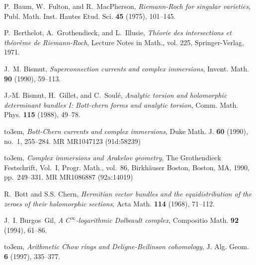 \documentclass[10pt,twoside]{article}
\numberwithin{equation}{section}
\theoremstyle{plain}
\theoremstyle{definition}
\begin{document}
%

\newcommand{\noopsort}[1]{} \newcommand{\printfirst}[2]{#1}
  \newcommand{\singleletter}[1]{#1} \newcommand{\switchargs}[2]{#2#1}
\providecommand{\bysame}{\leavevmode\hbox to3em{\hrulefill}\thinspace}
\providecommand{\MR}{\relax\ifhmode\unskip\space\fi MR }
\providecommand{\MRhref}[2]{%
  \href{http://www.ams.org/mathscinet-getitem?mr=#1}{#2}
}
\providecommand{\href}[2]{#2}
\begin{thebibliography}{10}

P.~Baum, W.~Fulton, and R.~MacPherson, \emph{{R}iemann-{R}och for singular
  varieties}, Publ. Math. Inst. Hautes Etud. Sci. \textbf{45} (1975), 101--145.

P.~Berthelot, A.~Grothendieck, and L.~Illusie, \emph{Th\'eorie des
  intersections et th\'eor\`eme de {R}iemann-{R}och}, Lecture Notes in Math.,
  vol. 225, Springer-Verlag, 1971.

J.~M. Bismut, \emph{Superconnection currents and complex immersions}, Invent.
  Math. \textbf{90} (1990), 59--113.

J.-M. Bismut, H.~Gillet, and C.~Soul{\'e}, \emph{Analytic torsion and
  holomorphic determinant bundles {I}: Bott-chern forms and analytic torsion},
  Comm. Math. Phys. \textbf{115} (1988), 49--78.

\bysame, \emph{Bott-{C}hern currents and complex immersions}, Duke Math. J.
  \textbf{60} (1990), no.~1, 255--284. \MR{MR1047123 (91d:58239)}

\bysame, \emph{Complex immersions and {A}rakelov geometry}, The Grothendieck
  Festschrift, Vol.\ I, Progr. Math., vol.~86, Birkh\"auser Boston, Boston, MA,
  1990, pp.~249--331. \MR{MR1086887 (92a:14019)}

R.~Bott and S.S. Chern, \emph{Hermitian vector bundles and the equidistribution
  of the zeroes of their holomorphic sections}, Acta Math. \textbf{114} (1968),
  71--112.

J.~I. Burgos~Gil, \emph{A ${C}^{\infty}$-logarithmic {D}olbeault complex},
  Compositio Math. \textbf{92} (1994), 61--86.

\bysame, \emph{Arithmetic {C}how rings and {D}eligne-{B}eilinson cohomology},
  J. Alg. Geom. \textbf{6} (1997), 335--377.


\end{thebibliography}
\end{document}
